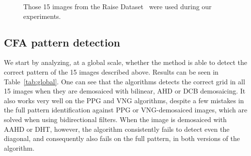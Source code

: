 \documentclass{ipol}
\begin{document}
\begin{figure}[ht]
    \caption{Those 15 images from the Raise Dataset~\cite{raise} were used during our experiments.}
    \label{fig:15images}
\end{figure}

\subsection{CFA pattern detection}
We start by analyzing, at a global scale, whether the method is able to detect the correct pattern of the 15 images described above. Results can be seen in Table~\ref{tab:global}. One can see that the algorithms detects the correct grid in all 15 images when they are demosaiced with bilinear, AHD or DCB demosaicing. It also works very well on the PPG and VNG algorithms, despite a few mistakes in the full pattern identification against PPG or VNG-demosaiced images, which are solved when using bidirectional filters. When the image is demosaiced with AAHD or DHT, however, the algorithm consistently fails to detect even the diagonal, and consequently also fails on the full pattern, in both versions of the algorithm.
\end{document}

